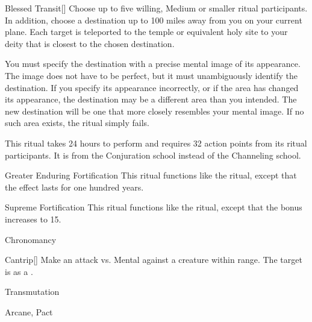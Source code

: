 \begin{ability}[\nth{4}]{Blessed Transit}[]
Choose up to five willing, Medium or smaller ritual participants.
In addition, choose a destination up to 100 miles away from you on your current plane.
Each target is teleported to the temple or equivalent holy site to your deity that is closest to the chosen destination.

You must specify the destination with a precise mental image of its appearance.
The image does not have to be perfect, but it must unambiguously identify the destination.
If you specify its appearance incorrectly, or if the area has changed its appearance, the destination may be a different area than you intended.
The new destination will be one that more closely resembles your mental image.
If no such area exists, the ritual simply fails.

This ritual takes 24 hours to perform and requires 32 action points from its ritual participants.
It is from the Conjuration school instead of the Channeling school.
\end{ability}
\vspace{0.25em}



\begin{ability}[\nth{5}]{Greater Enduring Fortification}
This ritual functions like the  ritual, except that the effect lasts for one hundred years.
\end{ability}
\vspace{0.25em}



\begin{ability}[\nth{6}]{Supreme Fortification}
This ritual functions like the  ritual, except that the  bonus increases to 15.
\end{ability}
\vspace{0.25em}


\newpage
\begin{spellsection}{Chronomancy}

\begin{spellheader}
\end{spellheader}


\begin{ability}{Cantrip}[]
Make an attack vs. Mental against a creature within \rngmed range.
\hit The target is  as a .
\end{ability}




 Transmutation

 Arcane, Pact
\end{spellsection}


